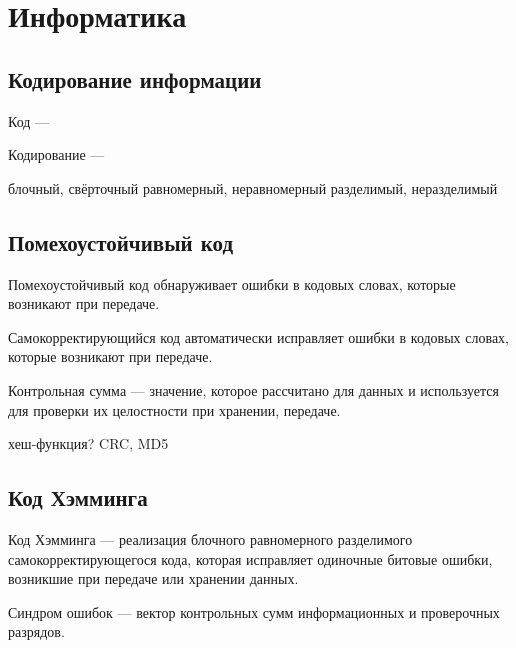 \section{Информатика}

\subsection{Кодирование информации}

{\bold Код} ---

{\bold Кодирование} ---

блочный, свёрточный
равномерный, неравномерный
разделимый, неразделимый

\subsection{Помехоустойчивый код}

{\bold Помехоустойчивый код} обнаруживает ошибки в кодовых словах, которые возникают при передаче.

{\bold Самокорректирующийся код} автоматически исправляет ошибки в кодовых словах, которые возникают при передаче.

{\bold Контрольная сумма} --- значение, которое рассчитано для данных и используется для проверки их целостности при хранении, передаче.

хеш-функция?
CRC, MD5

\subsection{Код Хэмминга}

{\bold Код Хэмминга} --- реализация блочного равномерного разделимого самокорректирующегося кода, которая исправляет одиночные битовые ошибки, возникшие при передаче или хранении данных.

{\bold Синдром ошибок} --- вектор контрольных сумм информационных и проверочных разрядов.
